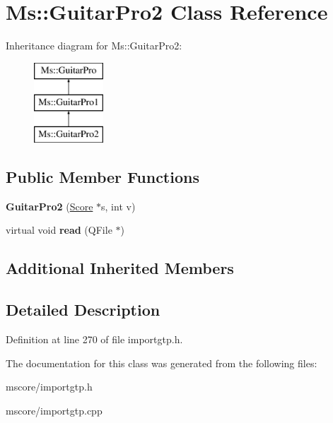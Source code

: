 \hypertarget{class_ms_1_1_guitar_pro2}{}\section{Ms\+:\+:Guitar\+Pro2 Class Reference}
\label{class_ms_1_1_guitar_pro2}
Inheritance diagram for Ms\+:\+:Guitar\+Pro2\+:\begin{figure}[H]
\begin{center}
\leavevmode
\includegraphics[height=3.000000cm]{class_ms_1_1_guitar_pro2}
\end{center}
\end{figure}
\subsection*{Public Member Functions}
\begin{DoxyCompactItemize}
\item 
\mbox{\label{class_ms_1_1_guitar_pro2_a39df2883410346855ec7673620dfa23f}} 
{\bfseries Guitar\+Pro2} (\hyperlink{class_ms_1_1_score}{Score} $\ast$s, int v)
\item 
\mbox{\label{class_ms_1_1_guitar_pro2_a379edceeaafe854986c9f639fb091669}} 
virtual void {\bfseries read} (Q\+File $\ast$)
\end{DoxyCompactItemize}
\subsection*{Additional Inherited Members}


\subsection{Detailed Description}


Definition at line 270 of file importgtp.\+h.



The documentation for this class was generated from the following files\+:\begin{DoxyCompactItemize}
\item 
mscore/importgtp.\+h\item 
mscore/importgtp.\+cpp\end{DoxyCompactItemize}

